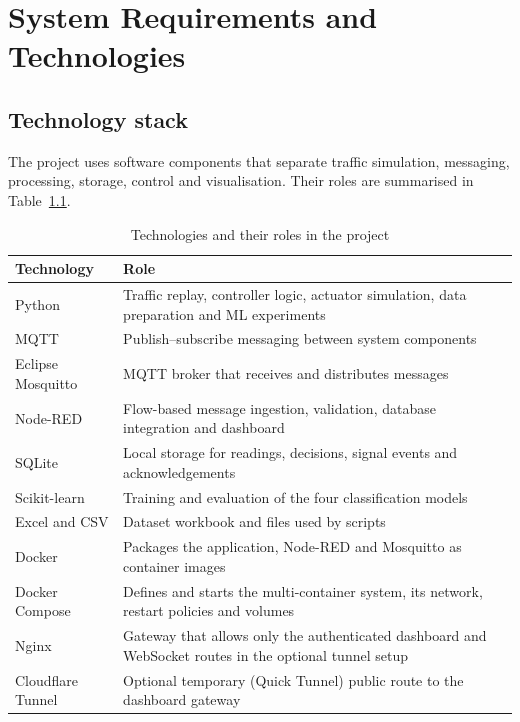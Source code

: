 \documentclass[12pt,a4paper,oneside]{report}
\begin{document}
\clearpage
\chapter{System Requirements and Technologies}
\section{Technology stack}
The project uses software components that separate traffic simulation, messaging, processing, storage, control and visualisation. Their roles are summarised in Table~\ref{tab:tech-roles}.

\begin{table}[htbp]\centering\small
\caption{Technologies and their roles in the project}\label{tab:tech-roles}
\begin{tabular}{|p{}|p{}|}\hline
\textbf{Technology} & \textbf{Role} \\\hline
Python & Traffic replay, controller logic, actuator simulation, data preparation and ML experiments \\\hline
MQTT & Publish--subscribe messaging between system components \\\hline
Eclipse Mosquitto & MQTT broker that receives and distributes messages~\cite{ref2} \\\hline
Node-RED & Flow-based message ingestion, validation, database integration and dashboard~\cite{ref3} \\\hline
SQLite & Local storage for readings, decisions, signal events and acknowledgements~\cite{ref4} \\\hline
Scikit-learn & Training and evaluation of the four classification models~\cite{ref5} \\\hline
Excel and CSV & Dataset workbook and files used by scripts \\\hline
Docker & Packages the application, Node-RED and Mosquitto as container images~\cite{ref7} \\\hline
Docker Compose & Defines and starts the multi-container system, its network, restart policies and volumes~\cite{ref8} \\\hline
Nginx & Gateway that allows only the authenticated dashboard and WebSocket routes in the optional tunnel setup~\cite{ref9} \\\hline
Cloudflare Tunnel & Optional temporary (Quick Tunnel) public route to the dashboard gateway~\cite{ref10} \\\hline
\end{tabular}\end{table}
\end{document}
